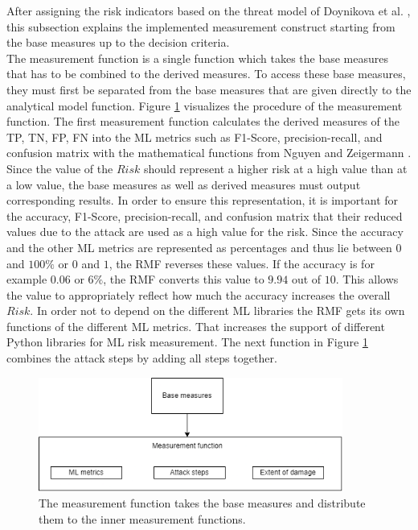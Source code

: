 After assigning the risk indicators based on the threat model of Doynikova et al. \cite{DBLP:conf/crisis/DoynikovaNGK20}, this subsection explains the implemented measurement construct starting from the base measures up to the decision criteria. \\
The measurement function is a single function which takes the base measures that has to be combined to the derived measures. To access these base measures, they must first be separated from the base measures that are given directly to the analytical model function. Figure \ref{fig:impl_meas_func} visualizes the procedure of the measurement function. The first measurement function calculates the derived measures of the TP, TN, FP, FN into the ML metrics such as F1-Score, precision-recall, and confusion matrix with the mathematical functions from Nguyen and Zeigermann \cite{9783960101925}.
Since the value of the $Risk$ should represent a higher risk at a high value than at a low value, the base measures as well as derived measures must output corresponding results. In order to ensure this representation, it is important for the accuracy, F1-Score, precision-recall, and confusion matrix that their reduced values due to the attack are used as a high value for the risk. Since the accuracy and the other ML metrics are represented as percentages and thus lie between $0$ and $100\%$ or $0$ and $1$, the RMF reverses these values. If the accuracy
is for example $0.06$ or $6\%$, the RMF converts this value to $9.94$ out of $10$. This allows the value to appropriately reflect how much the accuracy increases the overall $Risk$.
In order not to depend on the different ML libraries the RMF gets its own functions of the different ML metrics. That increases the support of different Python libraries for ML risk measurement. The next function in Figure \ref{fig:impl_meas_func} combines the attack steps by adding all steps together.

\begin{figure}[ht!]
  \centering
  \includegraphics[width=10cm]{pictures/impl_meas_func.png}
  \caption{The measurement function takes the base measures and distribute them to the inner measurement functions.}
  \label{fig:impl_meas_func}
\end{figure}

